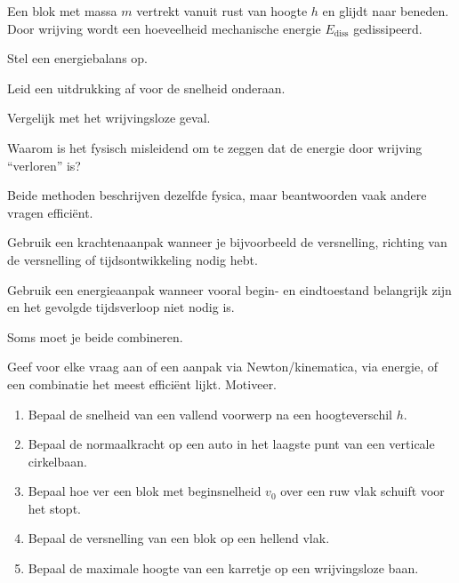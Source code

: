 \documentclass{ximera}
\begin{document}
\begin{oefening}{\oefU\ESS}

Een blok met massa $m$ vertrekt vanuit rust van hoogte $h$ en glijdt naar
beneden. Door wrijving wordt een hoeveelheid mechanische energie
$E_{\mathrm{diss}}$ gedissipeerd.

\begin{question}
Stel een energiebalans op.
\end{question}

\begin{question}
Leid een uitdrukking af voor de snelheid onderaan.
\end{question}

\begin{question}
Vergelijk met het wrijvingsloze geval.
\end{question}

\begin{question}
Waarom is het fysisch misleidend om te zeggen dat de energie door wrijving
``verloren'' is?
\end{question}

\end{oefening}



Beide methoden beschrijven dezelfde fysica, maar beantwoorden vaak andere
vragen efficiënt.

Gebruik een krachtenaanpak wanneer je bijvoorbeeld de versnelling, richting
van de versnelling of tijdsontwikkeling nodig hebt.

Gebruik een energieaanpak wanneer vooral begin- en eindtoestand belangrijk
zijn en het gevolgde tijdsverloop niet nodig is.

Soms moet je beide combineren.

\begin{oefening}{\oefU\ESS}

Geef voor elke vraag aan of een aanpak via Newton/kinematica, via energie, of
een combinatie het meest efficiënt lijkt. Motiveer.

\begin{enumerate}
  \item Bepaal de snelheid van een vallend voorwerp na een hoogteverschil $h$.
  \item Bepaal de normaalkracht op een auto in het laagste punt van een
        verticale cirkelbaan.
  \item Bepaal hoe ver een blok met beginsnelheid $v_0$ over een ruw vlak
        schuift voor het stopt.
  \item Bepaal de versnelling van een blok op een hellend vlak.
  \item Bepaal de maximale hoogte van een karretje op een wrijvingsloze baan.
\end{enumerate}

\end{oefening}
\end{document}
